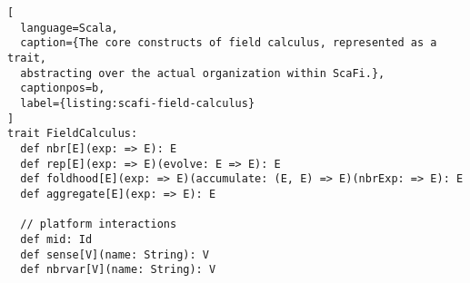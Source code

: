 \begin{lstlisting}[
  language=Scala,
  caption={The core constructs of field calculus, represented as a trait,
  abstracting over the actual organization within ScaFi.},
  captionpos=b,
  label={listing:scafi-field-calculus}
]
trait FieldCalculus:
  def nbr[E](exp: => E): E
  def rep[E](exp: => E)(evolve: E => E): E
  def foldhood[E](exp: => E)(accumulate: (E, E) => E)(nbrExp: => E): E
  def aggregate[E](exp: => E): E

  // platform interactions
  def mid: Id
  def sense[V](name: String): V
  def nbrvar[V](name: String): V
\end{lstlisting}
